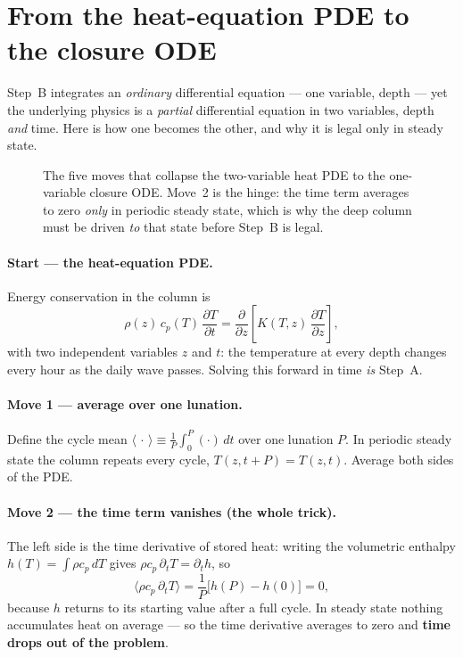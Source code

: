 \documentclass[11pt]{report}
\begin{document}
\section{From the heat-equation PDE to the closure ODE}\label{app:pde2ode}

\begin{plain}
Step~B integrates an \emph{ordinary} differential equation --- one variable, depth ---
yet the underlying physics is a \emph{partial} differential equation in two variables,
depth \emph{and} time. Here is how one becomes the other, and why it is legal only in
steady state.
\end{plain}

\begin{figure}[htbp]\centering

\caption{The five moves that collapse the two-variable heat PDE to the
one-variable closure ODE. Move~2 is the hinge: the time term averages to
zero \emph{only} in periodic steady state, which is why the deep column
must be driven \emph{to} that state before Step~B is legal.}
\label{fig:pde2odeflow}
\end{figure}

\paragraph{Start --- the heat-equation PDE.} Energy conservation in the column is
\[
\rho(z)\,c_p(T)\,\frac{\partial T}{\partial t}
=\frac{\partial}{\partial z}\!\left[K(T,z)\,\frac{\partial T}{\partial z}\right],
\]
with two independent variables $z$ and $t$: the temperature at every depth changes
every hour as the daily wave passes. Solving this forward in time \emph{is} Step~A.

\paragraph{Move 1 --- average over one lunation.} Define the cycle mean
$\langle\,\cdot\,\rangle\equiv\frac1P\int_0^P(\cdot)\,dt$ over one lunation $P$. In
periodic steady state the column repeats every cycle, $T(z,t{+}P)=T(z,t)$. Average both
sides of the PDE.

\paragraph{Move 2 --- the time term vanishes (the whole trick).} The left side is the
time derivative of stored heat: writing the volumetric enthalpy $h(T)=\int\rho c_p\,dT$
gives $\rho c_p\,\partial_t T=\partial_t h$, so
\[
\bigl\langle \rho c_p\,\partial_t T\bigr\rangle
=\frac1P\bigl[h(P)-h(0)\bigr]=0,
\]
because $h$ returns to its starting value after a full cycle. In steady state nothing
accumulates heat on average --- so the time derivative averages to zero and
\textbf{time drops out of the problem}.
\end{document}
